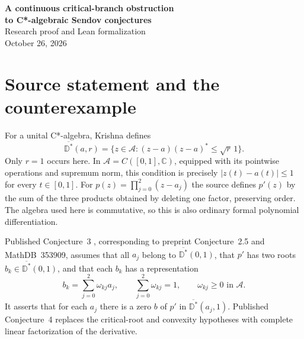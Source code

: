 \documentclass[11pt]{article}
\newcommand{\A}{\mathcal A}
\newcommand{\D}{\overline{\mathbb D^*}}
\begin{document}
\begin{center}
{\Large\bfseries A continuous critical-branch obstruction\\to C*-algebraic Sendov conjectures}\\[.5em]
Research proof and Lean formalization\\
October 26, 2026
\end{center}
\begin{abstract}
We give a cubic in the commutative unital C*-algebra
$C([0,1],\mathbb C)$ whose roots have norm at most $9/10$, whose derivative
splits completely into two distinct continuous critical branches of norm
less than one, and whose critical branches are positive continuous convex
combinations of the original roots. Nevertheless, every critical element
has distance greater than $21/20$ from one fixed root. This contradicts
Conjecture~3 of Krishna's published C*-algebraic Sendov paper, originally
Conjecture~2.5 of its preprint, and its completely split derivative variant
(published Conjecture~4). The obstruction concerns the existence of one
global continuous critical element. It does not contradict scalar Sendov.
The two source formulations are treated as one combined outcome.
\end{abstract}

\section{Source statement and the counterexample}
For a unital C*-algebra, Krishna \cite[Definition~2]{K26} defines
\[
 \D(a,r)=\{z\in\A:(z-a)(z-a)^*\le\sqrt r\,1\}.
\]
Only $r=1$ occurs here. In $\A=C([0,1],\mathbb C)$, equipped with its
pointwise operations and supremum norm, this condition is precisely
$|z(t)-a(t)|\le1$ for every $t\in[0,1]$.
For $p(z)=\prod_{j=0}^2(z-a_j)$ the source defines $p'(z)$ by the sum of
the three products obtained by deleting one factor, preserving order.
The algebra used here is commutative, so this is also ordinary formal
polynomial differentiation.

Published Conjecture~3 \cite[p.~60]{K26}, corresponding to preprint
Conjecture~2.5 \cite{K22} and MathDB~353909, assumes that all $a_j$
belong to $\D(0,1)$, that $p'$ has two roots $b_k\in\D(0,1)$, and
that each $b_k$ has a representation
\begin{equation}\label{convex}
 b_k=\sum_{j=0}^2\omega_{kj}a_j,\qquad
 \sum_{j=0}^2\omega_{kj}=1,\qquad \omega_{kj}\ge0\text{ in }\A.
\end{equation}
It asserts that for each $a_j$ there is a zero $b$ of $p'$ in
$\D(a_j,1)$. Published Conjecture~4 replaces the critical-root and convexity
hypotheses with complete linear factorization of the derivative.
\end{document}
